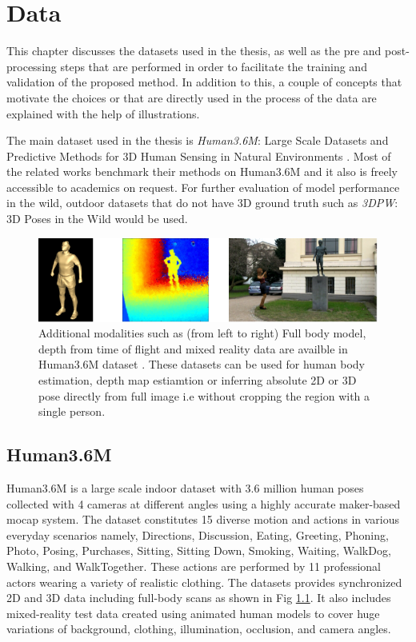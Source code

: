 \chapter{Data}
\label{chap:data}

This chapter discusses the datasets used in the thesis, as well as the pre and post-processing steps that are performed in order to facilitate the training and validation of the proposed method. In addition to this, a couple of concepts that motivate the choices or that are directly used in the process of the data are explained with the help of illustrations. 

The main dataset used in the thesis is \textit{Human3.6M}: Large Scale Datasets and Predictive Methods for 3D Human Sensing in Natural Environments \cite{H3.6}. Most of the related works benchmark their methods on Human3.6M and it also is freely accessible to academics on request. For further evaluation of model performance in the wild, outdoor datasets that do not have 3D ground truth such as \textit{3DPW}: 3D Poses in the Wild \cite{3dpw} would be used.

\begin{figure}[h]
    \centering
    \includegraphics[width=\textwidth]{figures/h36/modlities.png}
    \caption{Additional modalities such as (from left to right) Full body model, depth from time of flight and mixed reality data are availble in Human3.6M dataset \cite{H3.6}. These datasets can be used for human body estimation, depth map estiamtion or inferring absolute 2D or 3D pose directly from full image i.e without cropping the region with a single person.}
    \label{fig:h36_modality}
\end{figure}

\section{Human3.6M}
Human3.6M is a large scale indoor dataset with 3.6 million human poses collected with 4 cameras at different angles using a highly accurate maker-based \ac{mocap} system. The dataset constitutes 15 diverse motion and actions in various everyday scenarios namely, Directions, Discussion, Eating, Greeting, Phoning, Photo, Posing, Purchases, Sitting, Sitting Down, Smoking, Waiting, WalkDog, Walking, and WalkTogether. These actions are performed by 11 professional actors wearing a variety of realistic clothing. The datasets provides synchronized 2D and 3D data including full-body scans as shown in Fig \ref{fig:h36_modality}. It also includes mixed-reality test data created using animated human models to cover huge variations of background, clothing, illumination, occlusion, and camera angles.

